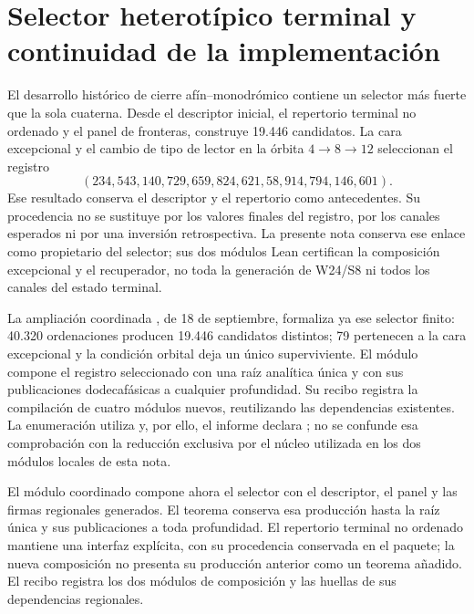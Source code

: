 \documentclass[11pt,a4paper]{article}
\begin{document}
\section{Selector heterotípico terminal y continuidad de la implementación}

El desarrollo histórico de cierre afín--monodrómico contiene un selector más
fuerte que la sola cuaterna. Desde el descriptor inicial, el repertorio
terminal no ordenado y el panel de fronteras, construye 19.446 candidatos.
La cara excepcional y el
cambio de tipo de lector en la órbita $4\to8\to12$ seleccionan el registro
\[
 (234,543,140,729,659,824,621,58,914,794,146,601).
\]
Ese resultado conserva el descriptor y el repertorio como antecedentes. Su procedencia no se
sustituye por los valores finales del registro, por los canales esperados
ni por una inversión retrospectiva. La presente nota conserva ese enlace
como propietario del selector; sus dos módulos Lean certifican la composición
excepcional y el recuperador, no toda la generación de W24/S8 ni todos los
canales del estado terminal.

La ampliación coordinada , de 18 de septiembre,
formaliza ya ese selector finito: 40.320 ordenaciones producen 19.446
candidatos distintos; 79 pertenecen a la cara excepcional y la condición
orbital deja un único superviviente. El módulo
 compone el registro seleccionado con una
raíz analítica única y con sus publicaciones dodecafásicas a cualquier
profundidad. Su recibo registra la compilación de cuatro módulos nuevos,
reutilizando las dependencias existentes. La enumeración utiliza
 y, por ello, el informe declara
; no se confunde esa comprobación con la reducción
exclusiva por el núcleo utilizada en los dos módulos locales de esta nota.

El módulo coordinado  compone ahora
el selector con el descriptor, el panel y las firmas regionales generados.
El teorema  conserva esa producción hasta la
raíz única y sus publicaciones a toda profundidad. El repertorio terminal
no ordenado mantiene una interfaz explícita, con su procedencia conservada
en el paquete; la nueva composición no presenta su producción anterior
como un teorema añadido. El recibo
 registra los dos módulos de
composición y las huellas de sus dependencias regionales.
\end{document}

